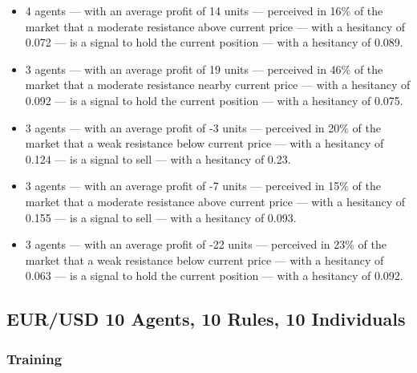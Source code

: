 {\small
  \begin{itemize}
  \item 4 agents — with an average profit of 14 units — perceived in 16\% of
    the market that a moderate resistance above current price — with a
    hesitancy of 0.072 — is a signal to hold the current position — with a
    hesitancy of 0.089.
  \item 3 agents — with an average profit of 19 units — perceived in 46\% of the
    market that a moderate resistance nearby current price — with a hesitancy of
    0.092 — is a signal to hold the current position — with a hesitancy of 0.075.
  \item 3 agents — with an average profit of -3 units — perceived in 20\% of the
    market that a weak resistance below current price — with a hesitancy of 0.124
    — is a signal to sell — with a hesitancy of 0.23.
  \item 3 agents — with an average profit of -7 units — perceived in 15\% of the
    market that a moderate resistance above current price — with a hesitancy of
    0.155 — is a signal to sell — with a hesitancy of 0.093.
  \item 3 agents — with an average profit of -22 units — perceived in 23\% of the
    market that a weak resistance below current price — with a hesitancy of 0.063
    — is a signal to hold the current position — with a hesitancy of 0.092.
  \end{itemize}
}

\subsection{EUR/USD 10 Agents, 10 Rules, 10 Individuals}
\label{results:interpretation-eur-usd-10agents-10rules-10individuals}

\subsubsection{Training}

